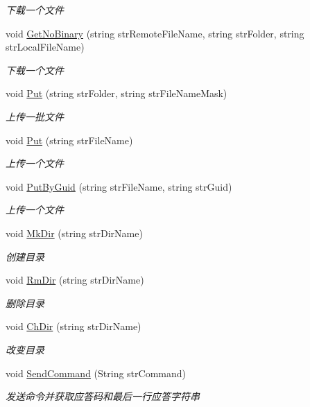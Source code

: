 \begin{DoxyCompactItemize}
\begin{DoxyCompactList}\small\item\em 下载一个文件 \end{DoxyCompactList}\item 
void \hyperlink{class_x_c_l_net_tools_1_1_f_t_p_1_1_f_t_p_client_a7648a7d3ce55e3332618aca711c3d6ea}{Get\-No\-Binary} (string str\-Remote\-File\-Name, string str\-Folder, string str\-Local\-File\-Name)
\begin{DoxyCompactList}\small\item\em 下载一个文件 \end{DoxyCompactList}\item 
void \hyperlink{class_x_c_l_net_tools_1_1_f_t_p_1_1_f_t_p_client_aa610dab6dd9699203f7d4da488b3ca20}{Put} (string str\-Folder, string str\-File\-Name\-Mask)
\begin{DoxyCompactList}\small\item\em 上传一批文件 \end{DoxyCompactList}\item 
void \hyperlink{class_x_c_l_net_tools_1_1_f_t_p_1_1_f_t_p_client_a0ce0fbef1a6c4a2c872315c104f8fd62}{Put} (string str\-File\-Name)
\begin{DoxyCompactList}\small\item\em 上传一个文件 \end{DoxyCompactList}\item 
void \hyperlink{class_x_c_l_net_tools_1_1_f_t_p_1_1_f_t_p_client_a9f333aedd5467c2fdc46d33298dc9dbb}{Put\-By\-Guid} (string str\-File\-Name, string str\-Guid)
\begin{DoxyCompactList}\small\item\em 上传一个文件 \end{DoxyCompactList}\item 
void \hyperlink{class_x_c_l_net_tools_1_1_f_t_p_1_1_f_t_p_client_aaf6ecfb2034736ffe5f88945ec873efe}{Mk\-Dir} (string str\-Dir\-Name)
\begin{DoxyCompactList}\small\item\em 创建目录 \end{DoxyCompactList}\item 
void \hyperlink{class_x_c_l_net_tools_1_1_f_t_p_1_1_f_t_p_client_a4c4167a6afd00ed6e1f5303e59555037}{Rm\-Dir} (string str\-Dir\-Name)
\begin{DoxyCompactList}\small\item\em 删除目录 \end{DoxyCompactList}\item 
void \hyperlink{class_x_c_l_net_tools_1_1_f_t_p_1_1_f_t_p_client_a6345c0af7cd414503395170157d0db3b}{Ch\-Dir} (string str\-Dir\-Name)
\begin{DoxyCompactList}\small\item\em 改变目录 \end{DoxyCompactList}\item 
void \hyperlink{class_x_c_l_net_tools_1_1_f_t_p_1_1_f_t_p_client_af99f1f4bd038882ec30bdf4e89d73d4a}{Send\-Command} (String str\-Command)
\begin{DoxyCompactList}\small\item\em 发送命令并获取应答码和最后一行应答字符串 \end{DoxyCompactList}\end{DoxyCompactItemize}
